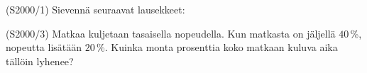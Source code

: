 \begin{tehtava}(S2000/1) Sievennä seuraavat lausekkeet:
\end{tehtava}

\begin{tehtava}(S2000/3) Matkaa kuljetaan tasaisella nopeudella. Kun matkasta on jäljellä $40$\,\%, nopeutta lisätään $20$\,\%. Kuinka monta prosenttia koko matkaan kuluva aika tällöin lyhenee?
\end{tehtava}